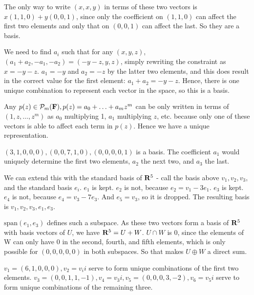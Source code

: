 \documentclass{article}
\begin{document}

The only way to write $(x,x,y)$ in terms of these two vectors is $x(1,1,0) +
y(0,0,1)$, since only the coefficient on $(1,1,0)$ can affect the first two
elements and only that on $(0,0,1)$ can affect the last. So they are a basis.


We need to find $a_i$ such that for any $(x, y, z)$, $(a_1 + a_2, -a_1, -a_2) =
(-y-z, y, z)$, simply rewriting the constraint as $x = -y - z$. $a_1 = -y$ and
$a_2 = -z$ by the latter two elements, and this does result in the correct value
for the first element: $a_1 + a_2 = -y - z$. Hence, there is one unique
combination to represent each vector in the space, so this is a basis.


Any $p(z) \in \mathcal{P}_m(\mathbf{F}), p(z) = a_0 + \ldots + a_mz^m$ can be only
written in terms of $(1, z, \ldots, z^m)$ as $a_0$ multiplying 1, $a_1$
multiplying $z$, etc. because only one of these vectors is able to affect each
term in $p(z)$. Hence we have a unique representation.


$(3,1,0,0,0), (0,0,7,1,0), (0,0,0,0,1)$ is a basis. The coefficient $a_1$ would
uniquely determine the first two elements, $a_2$ the next two, and $a_3$ the
last.


We can extend this with the standard basis of $\mathbf{R}^5$ - call the basis above
$v_1, v_2, v_3$, and the standard basis $e_i$. $e_1$ is kept. $e_2$ is not,
because $e_2 = v_1 - 3e_1$. $e_3$ is kept. $e_4$ is not, because $e_4 = v_3 -
7e_3$. And $e_5 = v_3$, so it is dropped. The resulting basis is $v_1, v_2, v_3,
e_1, e_3$.


$\text{span}(e_1, e_3)$ defines such a subspace. As these two vectors form a
basis of $\mathbf{R}^5$ with basis vectors of $U$, we have $\mathbf{R}^5 = U + W$. $U
\cap W$ is 0, since the elements of W can only have 0 in the second, fourth,
and fifth elements, which is only possible for $(0,0,0,0,0)$ in both subspaces.
So that makes $U \oplus W$ a direct sum.


$v_1 = (6,1,0,0,0), v_2 = v_ii$ serve to form unique combinations of the first
two elements. $v_3 = (0,0,1,1,-1), v_4 = v_3i, v_5 = (0,0,0,3,-2), v_6 = v_5i$
serve to form unique combinations of the remaining three.
\end{document}
